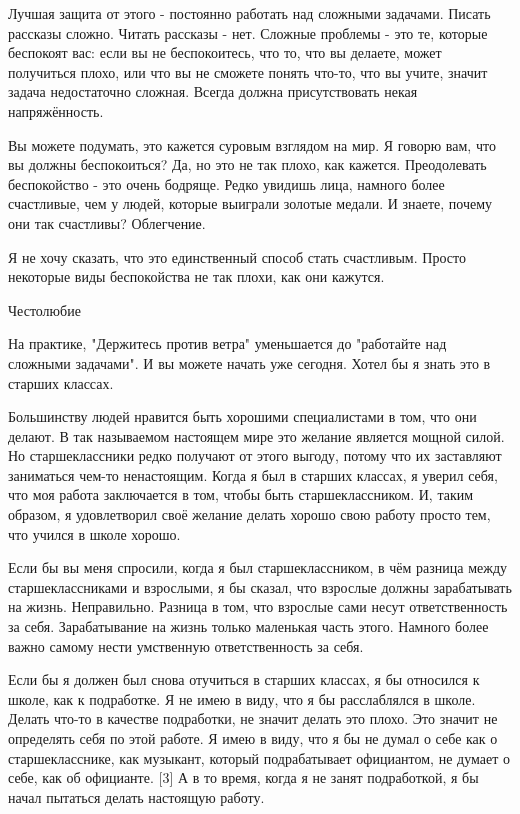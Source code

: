 \documentclass[ebook,12pt,oneside,openany]{memoir}
\begin{document}
Лучшая защита от этого - постоянно работать над сложными задачами.
Писать рассказы сложно. Читать рассказы - нет. Сложные проблемы - это
те, которые беспокоят вас: если вы не беспокоитесь, что то, что вы
делаете, может получиться плохо, или что вы не сможете понять что-то,
что вы учите, значит задача недостаточно сложная. Всегда должна
присутствовать некая напряжённость.

Вы можете подумать, это кажется суровым взглядом на мир. Я говорю вам,
что вы должны беспокоиться? Да, но это не так плохо, как кажется.
Преодолевать беспокойство - это очень бодряще. Редко увидишь лица,
намного более счастливые, чем у людей, которые выиграли золотые
медали. И знаете, почему они так счастливы? Облегчение.

Я не хочу сказать, что это единственный способ стать счастливым.
Просто некоторые виды беспокойства не так плохи, как они кажутся.

Честолюбие

На практике, "Держитесь против ветра" уменьшается до "работайте над
сложными задачами". И вы можете начать уже сегодня. Хотел бы я знать
это в старших классах.

Большинству людей нравится быть хорошими специалистами в том, что они
делают. В так называемом настоящем мире это желание является мощной
силой. Но старшеклассники редко получают от этого выгоду, потому что
их заставляют заниматься чем-то ненастоящим. Когда я был в старших
классах, я уверил себя, что моя работа заключается в том, чтобы быть
старшеклассником. И, таким образом, я удовлетворил своё желание делать
хорошо свою работу просто тем, что учился в школе хорошо.

Если бы вы меня спросили, когда я был старшеклассником, в чём разница
между старшеклассниками и взрослыми, я бы сказал, что взрослые должны
зарабатывать на жизнь. Неправильно. Разница в том, что взрослые сами
несут ответственность за себя. Зарабатывание на жизнь только маленькая
часть этого. Намного более важно самому нести умственную
ответственность за себя.

Если бы я должен был снова отучиться в старших классах, я бы относился
к школе, как к подработке. Я не имею в виду, что я бы расслаблялся в
школе. Делать что-то в качестве подработки, не значит делать это
плохо. Это значит не определять себя по этой работе. Я имею в виду,
что я бы не думал о себе как о старшекласснике, как музыкант, который
подрабатывает официантом, не думает о себе, как об официанте. [3] А в
то время, когда я не занят подработкой, я бы начал пытаться делать
настоящую работу.
\end{document}
